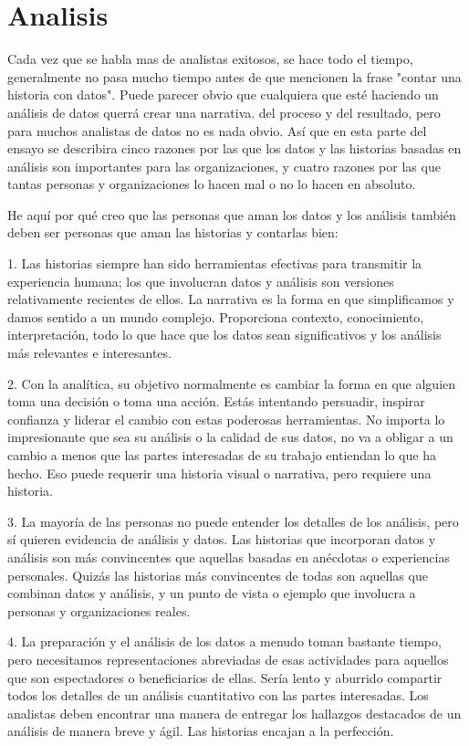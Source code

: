 \documentclass[preprint,12pt]{elsarticle}
\begin{document}
\pagebreak
\section{Analisis}
	

Cada vez que se habla mas de analistas exitosos, se hace todo el tiempo, generalmente no pasa mucho tiempo antes de que mencionen la frase "contar una historia con datos". Puede parecer obvio que cualquiera que esté haciendo un análisis de datos querrá crear una narrativa. del proceso y del resultado, pero para muchos analistas de datos no es nada obvio. Así que en esta parte del ensayo se describira cinco razones por las que los datos y las historias basadas en análisis son importantes para las organizaciones, y cuatro razones por las que tantas personas y organizaciones lo hacen mal o no lo hacen en absoluto. \hfill \break

He aquí por qué creo que las personas que aman los datos y los análisis también deben ser personas que aman las historias y contarlas bien: \hfill \break

1. Las historias siempre han sido herramientas efectivas para transmitir la experiencia humana; los que involucran datos y análisis son versiones relativamente recientes de ellos. La narrativa es la forma en que simplificamos y damos sentido a un mundo complejo. Proporciona contexto, conocimiento, interpretación, todo lo que hace que los datos sean significativos y los análisis más relevantes e interesantes. \hfill \break

2. Con la analítica, su objetivo normalmente es cambiar la forma en que alguien toma una decisión o toma una acción. Estás intentando persuadir, inspirar confianza y liderar el cambio con estas poderosas herramientas. No importa lo impresionante que sea su análisis o la calidad de sus datos, no va a obligar a un cambio a menos que las partes interesadas de su trabajo entiendan lo que ha hecho. Eso puede requerir una historia visual o narrativa, pero requiere una historia. \hfill \break

3. La mayoría de las personas no puede entender los detalles de los análisis, pero sí quieren evidencia de análisis y datos. Las historias que incorporan datos y análisis son más convincentes que aquellas basadas en anécdotas o experiencias personales. Quizás las historias más convincentes de todas son aquellas que combinan datos y análisis, y un punto de vista o ejemplo que involucra a personas y organizaciones reales. \hfill \break

4. La preparación y el análisis de los datos a menudo toman bastante tiempo, pero necesitamos representaciones abreviadas de esas actividades para aquellos que son espectadores o beneficiarios de ellas. Sería lento y aburrido compartir todos los detalles de un análisis cuantitativo con las partes interesadas. Los analistas deben encontrar una manera de entregar los hallazgos destacados de un análisis de manera breve y ágil. Las historias encajan a la perfección. \hfill \break
\end{document}
